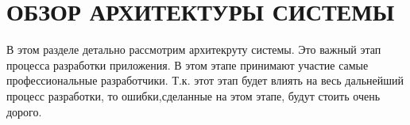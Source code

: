 \section{ОБЗОР АРХИТЕКТУРЫ СИСТЕМЫ}

В этом разделе детально рассмотрим архитекруту системы.
Это важный этап процесса разработки приложения. В этом этапе принимают участие самые профессиональные разработчики. Т.к. этот этап будет влиять на весь дальнейший процесс разработки, то ошибки,сделанные на этом этапе, будут стоить очень дорого.



